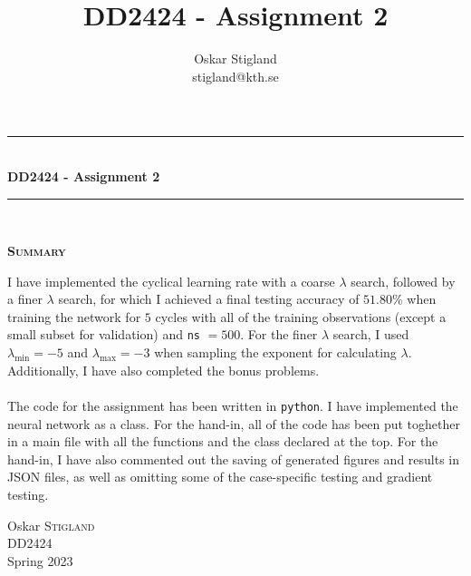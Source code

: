 \documentclass{article}
\title{DD2424 - Assignment 2}
\author{Oskar Stigland \\ stigland@kth.se}
\begin{document}

	\begin{titlepage}
		\begin{center} 
			
			\rule{\linewidth}{0.5mm}\\[0.5 cm]
			{ \huge \bfseries DD2424 - Assignment 2}\\[0.3 cm] %
			\rule{\linewidth}{0.5mm}\\[1 cm]
					
			\small\vfill
			\begin{center}
			\centering
			{\large \bfseries \textsc{Summary}}\\
			\vspace{1cm}
			\begin{minipage}{10cm}
				
				I have implemented the cyclical learning rate with a coarse $\lambda$ search, followed by a finer $\lambda$ search, for which I achieved a final testing accuracy of $51.80$\% when training the network for $5$ cycles with all of the training observations (except a small subset for validation) and \texttt{ns} $=500$. For the finer $\lambda$ search, I used $\lambda_{\text{min}} = -5$ and $\lambda_{\text{max}} = -3$ when sampling the exponent for calculating $\lambda$. Additionally, I have also completed the bonus problems.\\\\
%
	The code for the assignment has been written in \texttt{python}. I have implemented the neural network as a class. For the hand-in, all of the code has been put toghether in a main file with all the functions and the class declared at the top. For the hand-in, I have also commented out the saving of generated figures and results in JSON files, as well as omitting some of the case-specific testing and gradient testing.
			\end{minipage}
			\end{center}
			\large\vfill
						

		\end{center}	
		
		\begin{minipage}{0.4\textwidth}
			\begin{flushleft} \large
				Oskar \textsc{Stigland}\\
				DD2424\\
				Spring 2023
			\end{flushleft}
		\end{minipage}	

	\end{titlepage}
\end{document}
